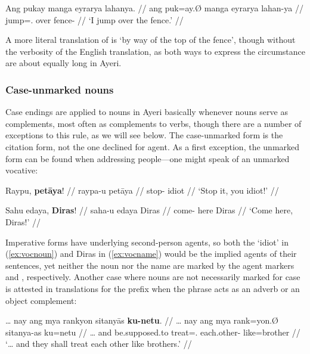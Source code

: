 \ex\begingl
	\gla Ang pukay manga eyrarya lahanya. //
	\glb ang puk=ay.Ø manga eyrarya lahan-ya //
	\glc \AgtT{} jump=\Fsg{}.\Top{} \Dir{} over fence-\Loc{} //
	\glft `I jump over the fence.' //
\endgl\xe

A more literal translation of  is `by
way of the top of the fence', though without the verbosity of the English
translation, as both ways to express the circumstance are about equally long in
Ayeri.


\subsubsection{Case-unmarked nouns}
\label{subsec:uncased}

Case endings are applied to nouns in Ayeri basically whenever nouns serve as
complements, most often as complements to verbs, though there are a number of
exceptions to this rule, as we will see below. The case-unmarked form is the
citation form, not the one declined for agent. As a first exception, the
unmarked form can be found when addressing people---one might speak of an
unmarked vocative:

\pex
\a\label{ex:vocnoun}\begingl
	\gla Raypu, \textbf{petāya}! //
	\glb raypa-u petāya //
	\glc stop-\Imp{} idiot //
	\glft `Stop it, you idiot!' //
\endgl

\a\label{ex:vocname}\begingl
	\gla Sahu edaya, \textbf{Diras}! //
	\glb saha-u edaya Diras //
	\glc come-\Imp{} here Diras //
	\glft `Come here, Diras!' //
\endgl
\xe

Imperative forms have underlying second-person agents, so both the `idiot' in
(\ref{ex:vocnoun}) and Diras in (\ref{ex:vocname}) would be the implied agents
of their sentences, yet neither the noun nor the name are marked by the agent
markers  and , respectively. Another case where
nouns are not necessarily marked for case is attested in translations for the
prefix  when the phrase acts as an adverb or an
object complement:

\pex
\a\label{ex:kuudhr}\begingl
	\gla … nay ang mya rankyon sitanyās \textbf{ku-netu}. //
	\glb … nay ang mya rank=yon.Ø sitanya-as ku=netu //
	\glc … and \AgtT{} be.supposed.to treat=\TplN{}.\Top{} 
		each.other-\Parg{} like=brother //
	\glft `… and they shall treat each other like brothers.'\footnotemark%
	//
\endgl

